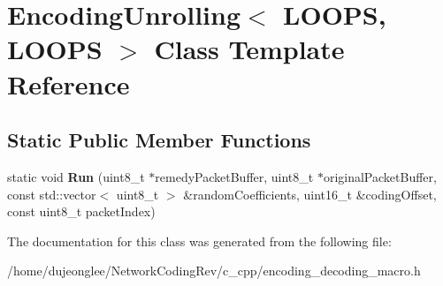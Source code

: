 \hypertarget{class_encoding_unrolling_3_01_l_o_o_p_s_00_01_l_o_o_p_s_01_4}{}\section{Encoding\+Unrolling$<$ L\+O\+O\+PS, L\+O\+O\+PS $>$ Class Template Reference}
\label{class_encoding_unrolling_3_01_l_o_o_p_s_00_01_l_o_o_p_s_01_4}
\subsection*{Static Public Member Functions}
\begin{DoxyCompactItemize}
\item 
static void {\bfseries Run} (uint8\+\_\+t $\ast$remedy\+Packet\+Buffer, uint8\+\_\+t $\ast$original\+Packet\+Buffer, const std\+::vector$<$ uint8\+\_\+t $>$ \&random\+Coefficients, uint16\+\_\+t \&coding\+Offset, const uint8\+\_\+t packet\+Index)\hypertarget{class_encoding_unrolling_3_01_l_o_o_p_s_00_01_l_o_o_p_s_01_4_a8f388974b4b556d2bf89680c21739316}{}\label{class_encoding_unrolling_3_01_l_o_o_p_s_00_01_l_o_o_p_s_01_4_a8f388974b4b556d2bf89680c21739316}

\end{DoxyCompactItemize}


The documentation for this class was generated from the following file\+:\begin{DoxyCompactItemize}
\item 
/home/dujeonglee/\+Network\+Coding\+Rev/c\+\_\+cpp/encoding\+\_\+decoding\+\_\+macro.\+h\end{DoxyCompactItemize}
